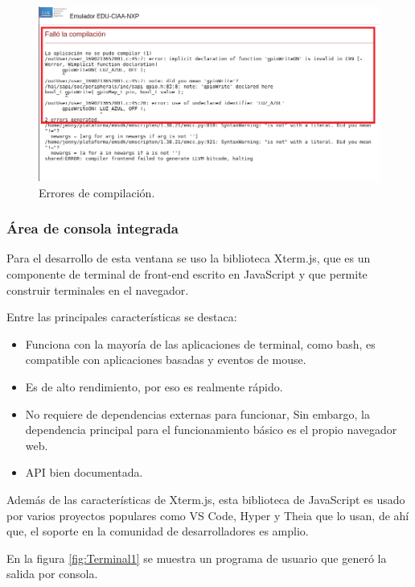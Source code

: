 \begin{figure}[ht]
	\centering
	\includegraphics[scale=.40]{./Figures/PlataformaErrores2.png}
	\caption{Errores de compilación.}
	\label{fig:PlataformaErrores1}
\end{figure}

 
\subsubsection{Área de consola integrada}
Para el desarrollo de esta ventana se uso la biblioteca Xterm.js, que es un componente de terminal de front-end escrito en JavaScript y que permite construir terminales en el navegador. 

Entre las principales características se destaca:

\begin{itemize}
	\item Funciona con la mayoría de las aplicaciones de terminal, como bash, es compatible con aplicaciones basadas y eventos de mouse.
	\item Es de alto rendimiento, por eso es realmente rápido.
	\item No requiere de dependencias externas para funcionar, Sin embargo, la dependencia principal para el funcionamiento básico es el propio navegador web.
	\item API bien documentada.
\end{itemize}


Además de las características de Xterm.js, esta biblioteca de JavaScript es usado por varios proyectos populares como VS Code, Hyper y Theia que lo usan, de ahí que, el soporte en la comunidad de desarrolladores es amplio.

En la figura \ref{fig:Terminal1} se muestra un programa de usuario que generó la salida por consola.

